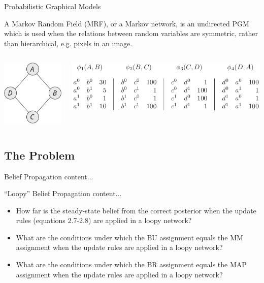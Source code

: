 \documentclass[handout]{beamer}
\begin{document}
\begin{frame}{Probabilistic Graphical Models}
    \pause
    \begin{definition}
        A Markov Random Field (MRF), or a Markov network, is an undirected PGM which is used when the relations between
        random variables are symmetric, rather than hierarchical, e.g. pixels in an image.
    \end{definition}
    \pause
    \begin{columns}
        \begin{column}[t]{0.2 \textwidth}
            \includegraphics[scale=0.4]{mrf1}
        \end{column}
        \begin{column}[t]{0.8 \textwidth}
            \includegraphics[scale=0.4]{mrf2}
        \end{column}
    \end{columns}
\end{frame}
\subsection{The Problem}
\begin{frame}{Belief Propagation}
    content...
\end{frame}
\begin{frame}{``Loopy'' Belief Propagation}
    content...
\end{frame}
\begin{frame}
    \begin{itemize}
        \item How far is the steady-state belief from the correct posterior when the update rules (equations 2.7-2.8) are applied in a loopy network?
        \item What are the conditions under which the BU assignment equals the MM assignment when the update rules are applied in a loopy network?
        \item What are the conditions under which the BR assignment equals the MAP assignment when the update rules are applied in a loopy network?
    \end{itemize}
\end{frame}
\end{document}
